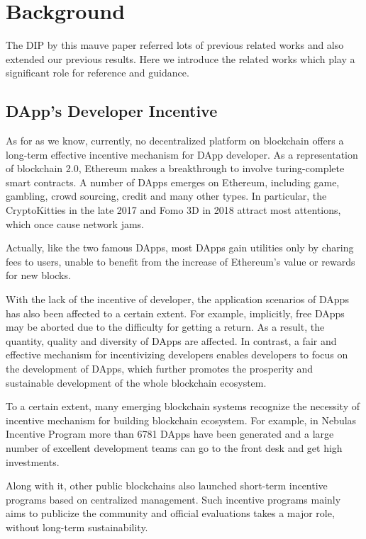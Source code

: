 \section{Background}
\label{sec:background}
The DIP by this mauve paper referred  lots of previous related works and also extended our previous results. Here we introduce the related works which play a significant role for reference and guidance.

\subsection{DApp's Developer Incentive}
As for as we know, currently, no decentralized platform on blockchain offers a long-term effective incentive mechanism for DApp developer. As a representation of blockchain 2.0, Ethereum makes a breakthrough to involve turing-complete smart contracts. A number of DApps emerges on Ethereum, including game, gambling, crowd sourcing, credit and many other types. In particular, the CryptoKitties in the late 2017 and Fomo 3D in 2018 attract most attentions, which once cause network jams. 

Actually, like the two famous DApps, most DApps gain utilities only by charing fees to users, unable to benefit from the increase of Ethereum's value or rewards for new blocks. 

With the lack of the incentive of developer, the application scenarios of DApps has also been affected to a certain extent. For example, implicitly, free DApps may be aborted due to the difficulty for getting a return. As a result, the quantity, quality and diversity of DApps are affected. In contrast, a fair and effective mechanism for incentivizing developers enables developers to focus on the development of DApps, which further promotes the prosperity and sustainable development of the whole blockchain ecosystem.

To a certain extent, many emerging blockchain systems recognize the necessity of incentive mechanism for building blockchain ecosystem. For example, in Nebulas Incentive Program more than 6781 DApps have been generated and a large number of excellent development teams can go to the front desk and get high investments. 

Along with it, other public blockchains also launched short-term incentive programs based on centralized management. Such incentive programs mainly aims to publicize the community and official evaluations takes a major role, without long-term sustainability.


